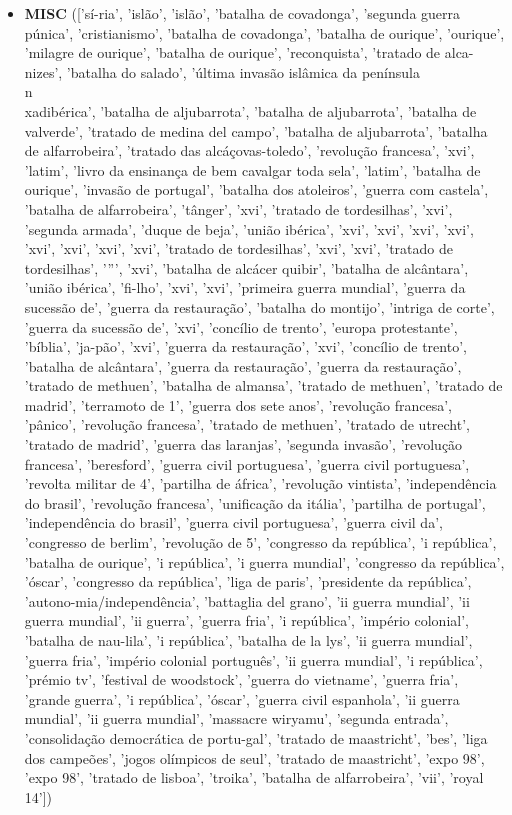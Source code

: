 \documentclass{article}
\begin{document}
\begin{itemize}
\item \textbf{MISC} (['sí-ria', 'islão', 'islão', 'batalha de covadonga', 'segunda guerra púnica', 'cristianismo', 'batalha de covadonga', 'batalha de ourique', 'ourique', 'milagre de ourique', 'batalha de ourique', 'reconquista', 'tratado de alca-nizes', 'batalha do salado', 'última invasão islâmica da península\\n\\xadibérica', 'batalha de aljubarrota', 'batalha de aljubarrota', 'batalha de valverde', 'tratado de medina del campo', 'batalha de aljubarrota', 'batalha de alfarrobeira', 'tratado das alcáçovas-toledo', 'revolução francesa', 'xvi', 'latim', 'livro da ensinança de bem cavalgar toda sela', 'latim', 'batalha de ourique', 'invasão de portugal', 'batalha dos atoleiros', 'guerra com castela', 'batalha de alfarrobeira', 'tânger', 'xvi', 'tratado de tordesilhas', 'xvi', 'segunda armada', 'duque de beja', 'união ibérica', 'xvi', 'xvi', 'xvi', 'xvi', 'xvi', 'xvi', 'xvi', 'xvi', 'tratado de tordesilhas', 'xvi', 'xvi', 'tratado de tordesilhas', '”', 'xvi', 'batalha de alcácer quibir', 'batalha de alcântara', 'união ibérica', 'fi-lho', 'xvi', 'xvi', 'primeira guerra mundial', 'guerra da sucessão de', 'guerra da restauração', 'batalha do montijo', 'intriga de corte', 'guerra da sucessão de', 'xvi', 'concílio de trento', 'europa protestante', 'bíblia', 'ja-pão', 'xvi', 'guerra da restauração', 'xvi', 'concílio de trento', 'batalha de alcântara', 'guerra da restauração', 'guerra da restauração', 'tratado de methuen', 'batalha de almansa', 'tratado de methuen', 'tratado de madrid', 'terramoto de 1', 'guerra dos sete anos', 'revolução francesa', 'pânico', 'revolução francesa', 'tratado de methuen', 'tratado de utrecht', 'tratado de madrid', 'guerra das laranjas', 'segunda invasão', 'revolução francesa', 'beresford', 'guerra civil portuguesa', 'guerra civil portuguesa', 'revolta militar de 4', 'partilha de áfrica', 'revolução vintista', 'independência do brasil', 'revolução francesa', 'unificação da itália', 'partilha de portugal', 'independência do brasil', 'guerra civil portuguesa', 'guerra civil da', 'congresso de berlim', 'revolução de 5', 'congresso da república', 'i república', 'batalha de ourique', 'i república', 'i guerra mundial', 'congresso da república', 'óscar', 'congresso da república', 'liga de paris', 'presidente da república', 'autono-mia/independência', 'battaglia del grano', 'ii guerra mundial', 'ii guerra mundial', 'ii guerra', 'guerra fria', 'i república', 'império colonial', 'batalha de nau-lila', 'i república', 'batalha de la lys', 'ii guerra mundial', 'guerra fria', 'império colonial português', 'ii guerra mundial', 'i república', 'prémio tv', 'festival de woodstock', 'guerra do vietname', 'guerra fria', 'grande guerra', 'i república', 'óscar', 'guerra civil espanhola', 'ii guerra mundial', 'ii guerra mundial', 'massacre wiryamu', 'segunda entrada', 'consolidação democrática de portu-gal', 'tratado de maastricht', 'bes', 'liga dos campeões', 'jogos olímpicos de seul', 'tratado de maastricht', 'expo 98', 'expo 98', 'tratado de lisboa', 'troika', 'batalha de alfarrobeira', 'vii', 'royal 14'])

\end{itemize}
\end{document}
